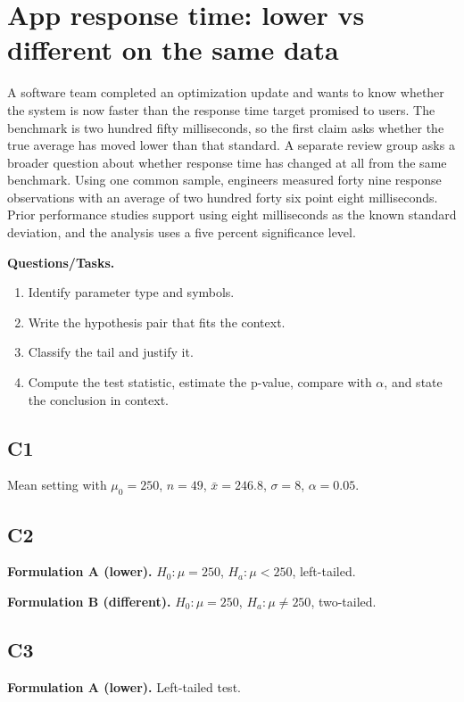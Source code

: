 \section{App response time: lower vs different on the same data}
A software team completed an optimization update and wants to know whether the system is now faster than the response time target promised to users. The benchmark is two hundred fifty milliseconds, so the first claim asks whether the true average has moved lower than that standard. A separate review group asks a broader question about whether response time has changed at all from the same benchmark. Using one common sample, engineers measured forty nine response observations with an average of two hundred forty six point eight milliseconds. Prior performance studies support using eight milliseconds as the known standard deviation, and the analysis uses a five percent significance level.

\textbf{Questions/Tasks.}
\begin{enumerate}
    \item[(C1)] Identify parameter type and symbols.
    \item[(C2)] Write the hypothesis pair that fits the context.
    \item[(C3)] Classify the tail and justify it.
    \item[(Extra analysis)] Compute the test statistic, estimate the p-value, compare with \(\alpha\), and state the conclusion in context.
\end{enumerate}

\subsection*{C1}
Mean setting with \(\mu_0=250\), \(n=49\), \(\bar{x}=246.8\), \(\sigma=8\), \(\alpha=0.05\).

\subsection*{C2}
\textbf{Formulation A (lower).}
\(H_0:\mu=250\), \(H_a:\mu<250\), left-tailed.

\textbf{Formulation B (different).}
\(H_0:\mu=250\), \(H_a:\mu\ne 250\), two-tailed.

\subsection*{C3}
\textbf{Formulation A (lower).} Left-tailed test. \LeftTailGraph

